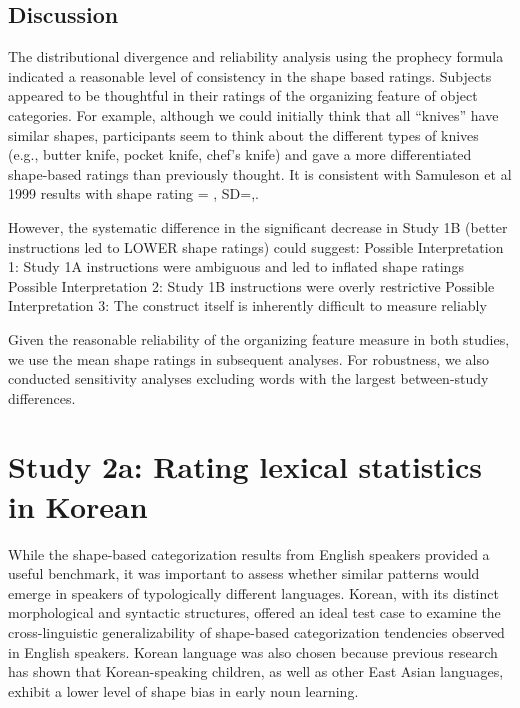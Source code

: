 \documentclass[
  american,
  man,floatsintext]{apa6}
\begin{document}
\subsection{Discussion}\label{discussion-1}

The distributional divergence and reliability analysis using the prophecy formula indicated a reasonable level of consistency in the shape based ratings. Subjects appeared to be thoughtful in their ratings of the organizing feature of object categories. For example, although we could initially think that all ``knives'' have similar shapes, participants seem to think about the different types of knives (e.g., butter knife, pocket knife, chef's knife) and gave a more differentiated shape-based ratings than previously thought. It is consistent with Samuleson et al 1999 results with shape rating = , SD=,.

However, the systematic difference in the significant decrease in Study 1B (better instructions led to LOWER shape ratings) could suggest:
Possible Interpretation 1: Study 1A instructions were ambiguous and led to inflated shape ratings
Possible Interpretation 2: Study 1B instructions were overly restrictive
Possible Interpretation 3: The construct itself is inherently difficult to measure reliably

Given the reasonable reliability of the organizing feature measure in both studies, we use the mean shape ratings in subsequent analyses. For robustness, we also conducted sensitivity analyses excluding words with the largest between-study differences.

\section{Study 2a: Rating lexical statistics in Korean}\label{study-2a-rating-lexical-statistics-in-korean}

While the shape-based categorization results from English speakers provided a useful benchmark, it was important to assess whether similar patterns would emerge in speakers of typologically different languages. Korean, with its distinct morphological and syntactic structures, offered an ideal test case to examine the cross-linguistic generalizability of shape-based categorization tendencies observed in English speakers. Korean language was also chosen because previous research has shown that Korean-speaking children, as well as other East Asian languages, exhibit a lower level of shape bias in early noun learning.
\end{document}
